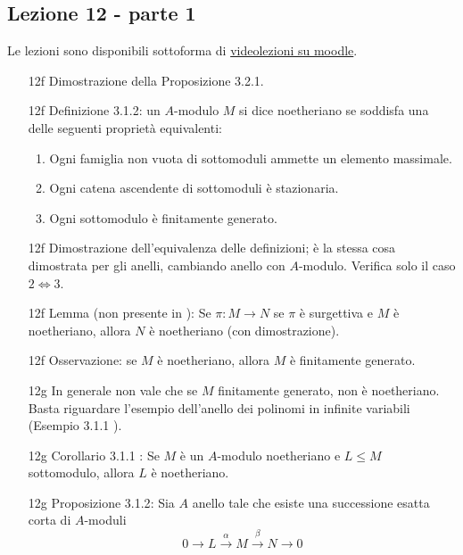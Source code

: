 \documentclass[italian]{article}
\begin{document}
    \subsection{Lezione 12 - parte 1}

	Le lezioni sono disponibili sottoforma di 
	\href{https://didatticaonline.unitn.it/dol/course/view.php?id=23268}{videolezioni
		su moodle}.
	
	\begin{enumerate}
      \item[12f] Dimostrazione della Proposizione 3.2.1. 
      \item[12f] Definizione 3.1.2\cite{vergura}: un $A$-modulo $M$ si dice 
        noetheriano se soddisfa una delle seguenti proprietà equivalenti:
        \begin{enumerate}
          \item Ogni famiglia non vuota di sottomoduli ammette un elemento
            massimale.
          \item Ogni catena ascendente di sottomoduli è stazionaria.
          \item Ogni sottomodulo è finitamente generato.
        \end{enumerate}
      \item[12f] Dimostrazione dell'equivalenza delle definizioni; è la stessa
        cosa dimostrata per gli anelli, cambiando anello con $A$-modulo.
        Verifica solo il caso $2 \iff 3$. 
      \item[12f] Lemma (non presente in \cite{vergura}): Se $\pi \colon M \to N$ 
        se $\pi$ è surgettiva e $M$ è noetheriano, allora $N$ è noetheriano 
        (con dimostrazione).
      \item[12f] Osservazione: se $M$ è noetheriano, allora $M$ è finitamente
        generato.
      \item[12g] In generale non vale che se $M$ finitamente generato, non
        è noetheriano. Basta riguardare l'esempio dell'anello dei polinomi in
        infinite variabili (Esempio 3.1.1 \cite{vergura}).
      \item[12g] Corollario 3.1.1 \cite{vergura}: Se $M$ è un $A$-modulo noetheriano 
        e $L \le M$ sottomodulo, allora $L$ è noetheriano.
      \item[12g] Proposizione 3.1.2\cite{vergura}: Sia $A$ anello tale che 
        esiste una successione esatta corta di $A$-moduli
        \begin{equation*}
          0 \to L \xrightarrow{\alpha} M \xrightarrow{\beta}
            N \to 0

\end{equation*}
\end{enumerate}
\end{document}
